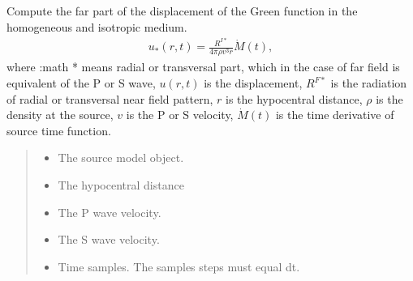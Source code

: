 \documentclass[letterpaper,10pt,english]{sphinxmanual}
\begin{document}
\begin{fulllineitems}
\begin{fulllineitems}
\label{\detokenize{api_lib:green_functions.HomogeneousGreenFunction.far}}
\pysigstartsignatures
{}
\pysigstopsignatures
\sphinxAtStartPar
Compute the far part of the displacement
of the Green function in the homogeneous and isotropic medium.
\begin{equation*}
\begin{split}u_* \left(r, t \right) = \frac{R^{I*}}{4\pi\rho v^3 r } \dot{M}\left( t \right),\end{split}
\end{equation*}
\sphinxAtStartPar
where :math * means radial or transversal part, which in the case of far field is equivalent of the P or S wave,
\(u \left(r, t \right)\) is the displacement,
\(R^{F*}\) is the radiation of radial or transversal near field pattern,
\(r\) is the hypocentral distance, \(\rho\) is the density at the source,
\(v\) is the P or S velocity,
\(\dot{M}\left( t \right)\) is the time derivative of source time function.
\begin{quote}\begin{description}
\begin{itemize}
\item {} 
\sphinxAtStartPar
{} \textendash{} The source model object.

\item {} 
\sphinxAtStartPar
{} \textendash{} The hypocentral distance

\item {} 
\sphinxAtStartPar
{} \textendash{} The P wave velocity.

\item {} 
\sphinxAtStartPar
{} \textendash{} The S wave velocity.

\item {} 
\sphinxAtStartPar
{} \textendash{} Time samples. The samples steps must equal dt.


\end{itemize}
\end{description}
\end{quote}
\end{fulllineitems}
\end{fulllineitems}
\end{document}
